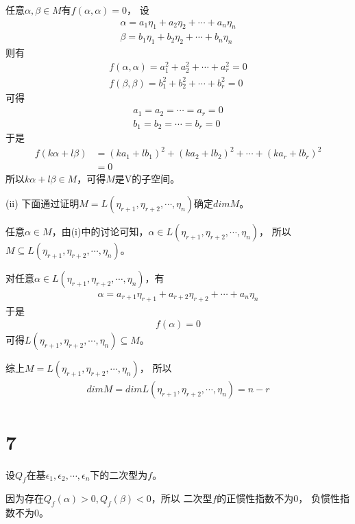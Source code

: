 \documentclass{article}
\begin{document}
任意$\alpha, \beta \in M$有$f(\alpha, \alpha) = 0$，
设
\begin{align*}
  \alpha = a_1 \eta_1 + a_2 \eta_2 + \cdots + a_n \eta_n \\
  \beta = b_1 \eta_1 + b_2 \eta_2 + \cdots + b_n \eta_n
\end{align*}
则有
\begin{align*}
  f(\alpha, \alpha) = a_1^2 + a_2^2 + \cdots + a_r^2 = 0 \\
  f(\beta, \beta) = b_1^2 + b_2^2 + \cdots + b_r^2 = 0
\end{align*}
可得
\begin{align*}
  a_1 = a_2 = \cdots = a_r = 0 \\
  b_1 = b_2 = \cdots = b_r = 0
\end{align*}
于是
\begin{align*}
  f(k\alpha + l\beta)
   & = (k a_1 + l b_1)^2 + (k a_2 + l b_2)^2 + \cdots + (k a_r + l b_r)^2 \\
   & = 0
\end{align*}
所以$k \alpha + l \beta \in M$，可得$M$是V的子空间。

(ii) 下面通过证明$M = L(\eta_{r+1}, \eta_{r+2}, \cdots, \eta_n)$确定$dim M$。

任意$\alpha \in M$，由(i)中的讨论可知，$\alpha \in L(\eta_{r+1}, \eta_{r+2}, \cdots, \eta_n)$，
所以$M \subseteq L(\eta_{r+1}, \eta_{r+2}, \cdots, \eta_n)$。

对任意$\alpha \in L(\eta_{r+1}, \eta_{r+2}, \cdots, \eta_n)$，有
\begin{align*}
  \alpha = a_{r+1} \eta_{r+1} + a_{r+2} \eta_{r+2} + \cdots + a_n \eta_n
\end{align*}
于是
\begin{align*}
  f(\alpha) = 0
\end{align*}
可得$L(\eta_{r+1}, \eta_{r+2}, \cdots, \eta_n) \subseteq M$。

综上$M = L(\eta_{r+1}, \eta_{r+2}, \cdots, \eta_n)$，
所以
\begin{align*}
  dim M = dim L(\eta_{r+1}, \eta_{r+2}, \cdots, \eta_n) = n - r
\end{align*}

\section*{7}

设$Q_f$在基$\epsilon_1, \epsilon_2, \cdots, \epsilon_n$下的二次型为$f$。

因为存在$Q_f(\alpha) > 0, Q_f(\beta) < 0$，所以
二次型$f$的正惯性指数不为0， 负惯性指数不为0。
\end{document}
